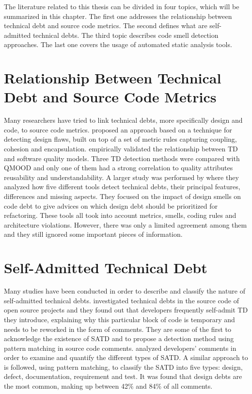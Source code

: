\label{sec:RevLitt}


\setlength{\parindent}{5ex}The literature related to this thesis can be divided in four topics, which will be summarized in this chapter. The first one addresses the relationship between technical debt and source code metrics. The second defines what are self-admitted technical debts. The third topic describes code smell detection approaches. The last one covers the usage of automated static analysis tools.

\section{Relationship Between Technical Debt and Source Code Metrics}

Many researchers have tried to link technical debts, more specifically design and code, to source code metrics. \citet{marinescu2012assessing} proposed an approach based on a technique for detecting design flaws, built on top of a set of metric rules capturing coupling, cohesion and encapsulation. \citet{griffith2014correspondence} empirically validated the relationship between \ac{TD} and software quality models. Three \ac{TD} detection methods were compared with \ac{QMOOD} \citep{bansiya2002hierarchical} and only one of them had a strong correlation to quality attributes reusability and understandability. A larger study was performed by \citet{fontana2016technical} where they analyzed how five different tools detect technical debts, their principal features, differences and missing aspects. They focused on the impact of design smells on code debt to give advices on which design debt should be prioritized for refactoring. These tools all took into account metrics, smells, coding rules and architecture violations. However, there was only a limited agreement among them and they still ignored some important pieces of information.

\section{Self-Admitted Technical Debt}

Many studies have been conducted in order to describe and classify the nature of self-admitted technical debts. \citet{PotdarS14} investigated technical debts in the source code of open source projects and they found out that developers frequently self-admit \ac{TD} they introduce, explaining why this particular block of code is temporary and needs to be reworked in the form of comments. They are some of the first to acknowledge the existence of \ac{SATD} and to propose a detection method using pattern matching in source code comments. \citet{MaldonadoS15} analyzed developers' comments in order to examine and quantify the different types of \ac{SATD}. A similar approach to \citet{PotdarS14} is followed, using pattern matching, to classify the \ac{SATD} into five types: design, defect, documentation, requirement and test. It was found that design debts are the most common, making up between 42\% and 84\% of all comments. \par

